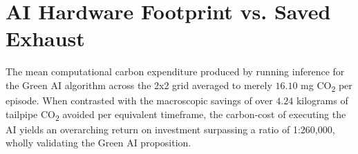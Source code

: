 \section{AI Hardware Footprint vs. Saved Exhaust}
The mean computational carbon expenditure produced by running inference for the Green AI algorithm across the 2x2 grid averaged to merely $16.10$ mg CO\textsubscript{2} per episode. When contrasted with the macroscopic savings of over $4.24$ kilograms of tailpipe CO\textsubscript{2} avoided per equivalent timeframe, the carbon-cost of executing the AI yields an overarching return on investment surpassing a ratio of 1:260,000, wholly validating the Green AI proposition.